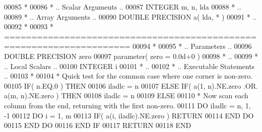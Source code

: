 \begin{DoxyCode}
00085 \textcolor{comment}{*}
00086 \textcolor{comment}{*     .. Scalar Arguments ..}
00087       \textcolor{keywordtype}{INTEGER}            m, n, lda
00088 \textcolor{comment}{*     ..}
00089 \textcolor{comment}{*     .. Array Arguments ..}
00090       \textcolor{keywordtype}{DOUBLE PRECISION}   a( lda, * )
00091 \textcolor{comment}{*     ..}
00092 \textcolor{comment}{*}
00093 \textcolor{comment}{*  =====================================================================}
00094 \textcolor{comment}{*}
00095 \textcolor{comment}{*     .. Parameters ..}
00096       \textcolor{keywordtype}{DOUBLE PRECISION} zero
00097       parameter( zero = 0.0d+0 )
00098 \textcolor{comment}{*     ..}
00099 \textcolor{comment}{*     .. Local Scalars ..}
00100       \textcolor{keywordtype}{INTEGER} i
00101 \textcolor{comment}{*     ..}
00102 \textcolor{comment}{*     .. Executable Statements ..}
00103 \textcolor{comment}{*}
00104 \textcolor{comment}{*     Quick test for the common case where one corner is non-zero.}
00105       \textcolor{keywordflow}{IF}( n.EQ.0 ) \textcolor{keywordflow}{THEN}
00106          iladlc = n
00107       \textcolor{keywordflow}{ELSE} \textcolor{keywordflow}{IF}( a(1, n).NE.zero .OR. a(m, n).NE.zero ) \textcolor{keywordflow}{THEN}
00108          iladlc = n
00109       \textcolor{keywordflow}{ELSE}
00110 \textcolor{comment}{*     Now scan each column from the end, returning with the first non-zero.}
00111          \textcolor{keywordflow}{DO} iladlc = n, 1, -1
00112             \textcolor{keywordflow}{DO} i = 1, m
00113                \textcolor{keywordflow}{IF}( a(i, iladlc).NE.zero ) \textcolor{keywordflow}{RETURN}
00114 \textcolor{keywordflow}{            END DO}
00115 \textcolor{keywordflow}{         END DO}
00116 \textcolor{keywordflow}{      END IF}
00117       \textcolor{keywordflow}{RETURN}
00118 \textcolor{keyword}{      END}
\end{DoxyCode}
